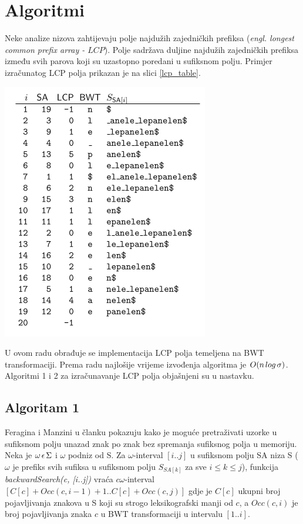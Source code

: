 \documentclass[times, utf8, seminar, numeric]{fer}
\begin{document}
\section{Algoritmi}

Neke analize nizova zahtijevaju polje najdužih zajedničkih prefiksa (\textit{engl. longest common prefix array - $LCP$}). Polje sadržava duljine najdužih zajedničkih prefiksa između svih parova koji su uzastopno poredani u sufiksnom polju. Primjer izračunatog LCP polja prikazan je na slici \ref{lcp_table}.



\begin{center}
	\includegraphics[scale=0.5]{slike/lcp_table.png}
	\label{lcp_table}
\end{center}


U ovom radu obrađuje se implementacija LCP polja temeljena na BWT transformaciji. Prema radu\cite{Beller2011} najlošije vrijeme izvođenja algoritma je $ O(n\hspace{0.5mm} log \hspace{0.5mm} \sigma) $. Algoritmi 1 i 2 za  izračunavanje LCP polja objašnjeni su u nastavku.

\subsection{Algoritam 1}
Feragina  i Manzini u članku\cite{feragina} pokazuju kako je moguće pretraživati uzorke u sufiksnom polju unazad znak po znak bez spremanja sufiksnog polja u memoriju. Neka je $\omega\hspace{0.5mm} \epsilon\hspace{0.5mm} \Sigma $ i $ \omega$ podniz od S. Za $\omega$-interval $[i..j]$ u sufiksnom polju SA niza S ($\omega$ je prefiks svih sufiksa u sufiksnom polju $S_{SA[k]}$ za sve $ i \leq k \leq j $), funkcija \textit{backwardSearch(c, [i..j])} vraća $ c\omega$-interval $[C[c] + Occ(c, i -1) + 1.. C[c] + Occ(c,j) ]$ gdje je $C[c]$ ukupni broj pojavljivanja znakova u S koji su strogo leksikografski manji od $c$, a $Occ(c,i)$ je broj pojavljivanja znaka $c$ u BWT transformaciji u intervalu $[1..i]$.
\end{document}
